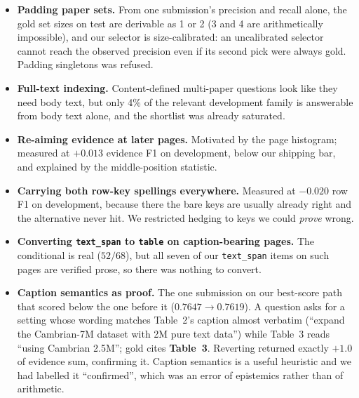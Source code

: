 \documentclass[11pt]{article}
\begin{document}
\begin{itemize}\itemsep2pt
\item \textbf{Padding paper sets.} From one submission's precision and recall
alone, the gold set sizes on test are derivable as 1 or 2 (3 and 4 are
arithmetically impossible), and our selector is size-calibrated: an uncalibrated
selector cannot reach the observed precision even if its second pick were always
gold. Padding singletons was refused.
\item \textbf{Full-text indexing.} Content-defined multi-paper questions look
like they need body text, but only 4\% of the relevant development family is
answerable from body text alone, and the shortlist was already saturated.
\item \textbf{Re-aiming evidence at later pages.} Motivated by the page
histogram; measured at $+0.013$ evidence F1 on development, below our shipping
bar, and explained by the middle-position statistic.
\item \textbf{Carrying both row-key spellings everywhere.} Measured at $-0.020$
row F1 on development, because there the bare keys are usually already right and
the alternative never hit. We restricted hedging to keys we could \emph{prove}
wrong.
\item \textbf{Converting \texttt{text\_span} to \texttt{table} on
caption-bearing pages.} The conditional is real ($52/68$), but all seven of our
\texttt{text\_span} items on such pages are verified prose, so there was nothing
to convert.
\item \textbf{Caption semantics as proof.} The one submission on our best-score
path that scored below the one before it ($0.7647 \to 0.7619$). A question asks for a setting whose wording matches Table~2's caption almost
verbatim (``expand the Cambrian-7M dataset with 2M pure text data'') while
Table~3 reads ``using Cambrian 2.5M''; gold cites \textbf{Table~3}. Reverting
returned exactly $+1.0$ of evidence sum, confirming it. Caption semantics is a
useful heuristic and we had labelled it ``confirmed'', which was an error of
epistemics rather than of arithmetic.
\end{itemize}
\end{document}
